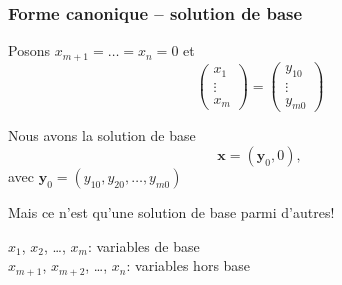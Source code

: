 \documentclass[t,usepdftitle=false]{beamer}
\def\bx{\boldsymbol{x}}
\def\by{\boldsymbol{y}}
\begin{document}
\begin{frame}
\frametitle{Forme canonique -- solution de base}

Posons
$x_{m+1} = \ldots = x_n = 0$ et
$$
\begin{pmatrix}
x_1 \\ \vdots \\ x_m
\end{pmatrix}
=
\begin{pmatrix}
y_{10} \\ \vdots \\ y_{m0}
\end{pmatrix}
$$

Nous avons la solution de base
$$
\bx = (\by_0, 0),
$$
avec $\by_0 = (y_{10},y_{20},\ldots,y_{m0})$

\mbox{}

Mais ce n'est qu'une solution de base parmi d'autres!

\mbox{}

$x_1$, $x_2$, \ldots, $x_m$: variables de base\\
$x_{m+1}$, $x_{m+2}$, \ldots, $x_n$: variables hors base

\end{frame}







\end{document}
